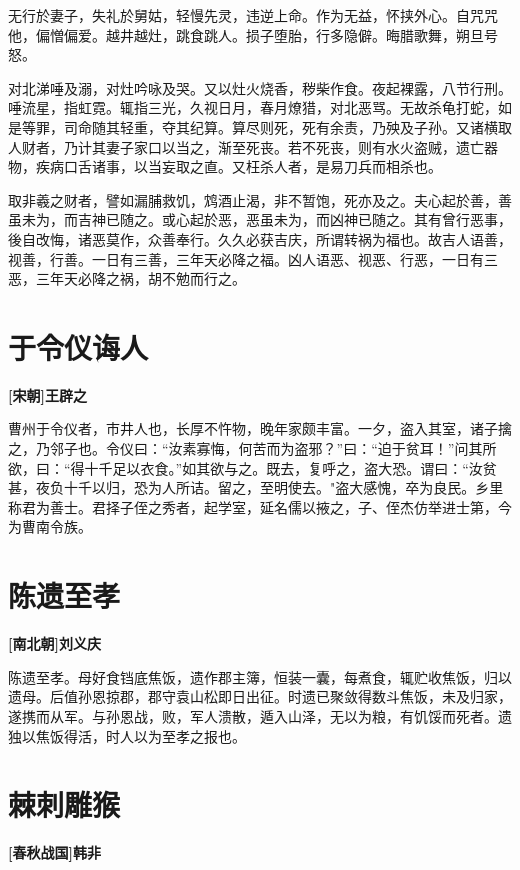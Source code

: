 \documentclass[UTF8,titlepage,oneside]{ctexbook}
\begin{document}
无行於妻子，失礼於舅姑，轻慢先灵，违逆上命。作为无益，怀挟外心。自咒咒他，偏憎偏爱。越井越灶，跳食跳人。损子堕胎，行多隐僻。晦腊歌舞，朔旦号怒。

对北涕唾及溺，对灶吟咏及哭。又以灶火烧香，秽柴作食。夜起裸露，八节行刑。唾流星，指虹霓。辄指三光，久视日月，春月燎猎，对北恶骂。无故杀龟打蛇，如是等罪，司命随其轻重，夺其纪算。算尽则死，死有余责，乃殃及子孙。又诸横取人财者，乃计其妻子家口以当之，渐至死丧。若不死丧，则有水火盗贼，遗亡器物，疾病口舌诸事，以当妄取之直。又枉杀人者，是易刀兵而相杀也。

取非羲之财者，譬如漏脯救饥，鸩酒止渴，非不暂饱，死亦及之。夫心起於善，善虽未为，而吉神已随之。或心起於恶，恶虽未为，而凶神已随之。其有曾行恶事，後自改悔，诸恶莫作，众善奉行。久久必获吉庆，所谓转祸为福也。故吉人语善，视善，行善。一日有三善，三年天必降之福。凶人语恶、视恶、行恶，一日有三恶，三年天必降之祸，胡不勉而行之。


\chapter*{于令仪诲人}
\begin{center}
	\textbf{[宋朝]王辟之}
\end{center}

曹州于令仪者，市井人也，长厚不忤物，晚年家颇丰富。一夕，盗入其室，诸子擒之，乃邻子也。令仪曰：“汝素寡悔，何苦而为盗邪？”曰：“迫于贫耳！”问其所欲，曰：“得十千足以衣食。”如其欲与之。既去，复呼之，盗大恐。谓曰：“汝贫甚，夜负十千以归，恐为人所诘。留之，至明使去。"盗大感愧，卒为良民。乡里称君为善士。君择子侄之秀者，起学室，延名儒以掖之，子、侄杰仿举进士第，今为曹南令族。


\chapter*{陈遗至孝}
\begin{center}
	\textbf{[南北朝]刘义庆}
\end{center}

陈遗至孝。母好食铛底焦饭，遗作郡主簿，恒装一囊，每煮食，辄贮收焦饭，归以遗母。后值孙恩掠郡，郡守袁山松即日出征。时遗已聚敛得数斗焦饭，未及归家，遂携而从军。与孙恩战，败，军人溃散，遁入山泽，无以为粮，有饥馁而死者。遗独以焦饭得活，时人以为至孝之报也。


\chapter*{棘刺雕猴}
\begin{center}
	\textbf{[春秋战国]韩非}
\end{center}
\end{document}
